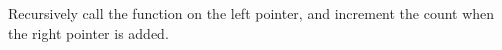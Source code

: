 \documentclass[preview]{standalone}
\begin{document}
Recursively call the function on the left pointer, and increment the count when the right pointer is added.\\
\end{document}
